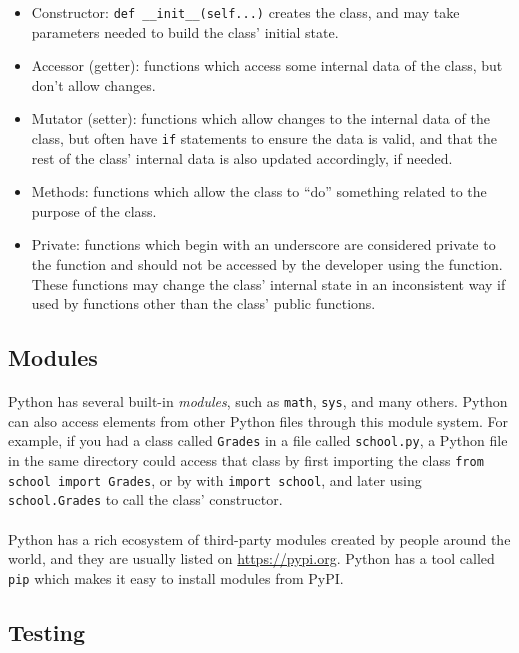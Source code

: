\documentclass[letter,10pt]{article}
\begin{document}
\begin{itemize}
    \item Constructor: \verb|def __init__(self...)| creates the class, and may take parameters needed to build the class' initial state.
    \item Accessor (getter): functions which access some internal data of the class, but don't allow changes.
    \item Mutator (setter): functions which allow changes to the internal data of the class, but often have \verb|if| statements to ensure the data is valid, and that the rest of the class' internal data is also updated accordingly, if needed.
    \item Methods: functions which allow the class to ``do'' something related to the purpose of the class.
    \item Private: functions which begin with an underscore are considered private to the function and should not be accessed by the developer using the function. These functions may change the class' internal state in an inconsistent way if used by functions other than the class' public functions.
\end{itemize}

\subsection{Modules}
\paragraph{}Python has several built-in \textit{modules}, such as \verb|math|, \verb|sys|, and many others. Python can also access elements from other Python files through this module system. For example, if you had a class called \verb|Grades| in a file called \verb|school.py|, a Python file in the same directory could access that class by first importing the class \verb|from school import Grades|, or by with \verb|import school|, and later using \verb|school.Grades| to call the class' constructor.

\paragraph{}Python has a rich ecosystem of third-party modules created by people around the world, and they are usually listed on \url{https://pypi.org}. Python has a tool called \verb|pip| which makes it easy to install modules from PyPI.

\subsection{Testing}
\end{document}

